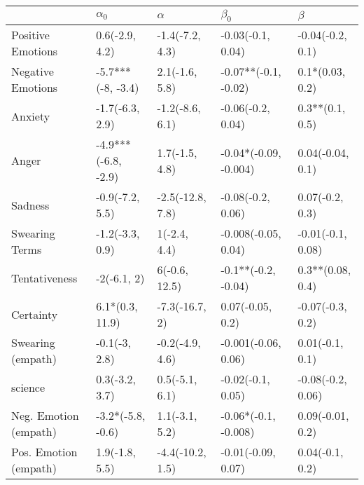 \begin{tabular}{lllll}
\toprule
{} &           $\alpha_0$ &          $\alpha$ &              $\beta_0$ &            $\beta$ \\
\midrule
Positive Emotions     &       0.6(-2.9, 4.2) &   -1.4(-7.2, 4.3) &      -0.03(-0.1, 0.04) &   -0.04(-0.2, 0.1) \\
Negative Emotions     &    -5.7***(-8, -3.4) &    2.1(-1.6, 5.8) &   -0.07**(-0.1, -0.02) &    0.1*(0.03, 0.2) \\
Anxiety               &      -1.7(-6.3, 2.9) &   -1.2(-8.6, 6.1) &      -0.06(-0.2, 0.04) &    0.3**(0.1, 0.5) \\
Anger                 &  -4.9***(-6.8, -2.9) &    1.7(-1.5, 4.8) &  -0.04*(-0.09, -0.004) &   0.04(-0.04, 0.1) \\
Sadness               &      -0.9(-7.2, 5.5) &  -2.5(-12.8, 7.8) &      -0.08(-0.2, 0.06) &    0.07(-0.2, 0.3) \\
Swearing Terms        &      -1.2(-3.3, 0.9) &      1(-2.4, 4.4) &    -0.008(-0.05, 0.04) &  -0.01(-0.1, 0.08) \\
Tentativeness         &          -2(-6.1, 2) &     6(-0.6, 12.5) &    -0.1**(-0.2, -0.04) &   0.3**(0.08, 0.4) \\
Certainty             &      6.1*(0.3, 11.9) &    -7.3(-16.7, 2) &       0.07(-0.05, 0.2) &   -0.07(-0.3, 0.2) \\
Swearing (empath)     &        -0.1(-3, 2.8) &   -0.2(-4.9, 4.6) &    -0.001(-0.06, 0.06) &    0.01(-0.1, 0.1) \\
science               &       0.3(-3.2, 3.7) &    0.5(-5.1, 6.1) &      -0.02(-0.1, 0.05) &  -0.08(-0.2, 0.06) \\
Neg. Emotion (empath) &    -3.2*(-5.8, -0.6) &    1.1(-3.1, 5.2) &   -0.06*(-0.1, -0.008) &   0.09(-0.01, 0.2) \\
Pos. Emotion (empath) &       1.9(-1.8, 5.5) &  -4.4(-10.2, 1.5) &     -0.01(-0.09, 0.07) &    0.04(-0.1, 0.2) \\
\bottomrule
\end{tabular}
